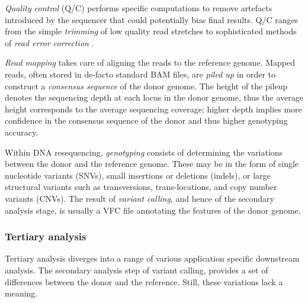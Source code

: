 \emph{Quality control} (Q/C) performs specific computations to remove artefacts introduced by the sequencer that could potentially bias final results.
Q/C ranges from the simple \emph{trimming} of low quality read stretches to sophisticated methods of \emph{read error correction} \citep{fiona}.

\emph{Read mapping} takes care of aligning the reads to the reference genome.
Mapped reads, often stored in de-facto standard BAM files, are \emph{piled up} in order to construct a \emph{consensus sequence} of the donor genome.
The height of the pileup denotes the sequencing depth at each locus in the donor genome, thus the average height corresponds to the average sequencing coverage;
higher depth implies more confidence in the consensus sequence of the donor and thus higher genotyping accuracy.

Within DNA resequencing, \emph{genotyping} consists of determining the variations between the donor and the reference genome.
These may be in the form of single nucleotide variants (SNVs), small insertions or deletions (indels), or large structural variants such as transversions, trans-locations, and copy number variants (CNVs).
The result of \emph{variant calling}, and hence of the secondary analysis stage, is usually a VFC file annotating the features of the donor genome.

\subsubsection{Tertiary analysis}

Tertiary analysis diverges into a range of various application specific downstream analysis.
The secondary analysis step of variant calling, provides a set of differences between the donor and the reference.
Still, these variations lack a meaning.



